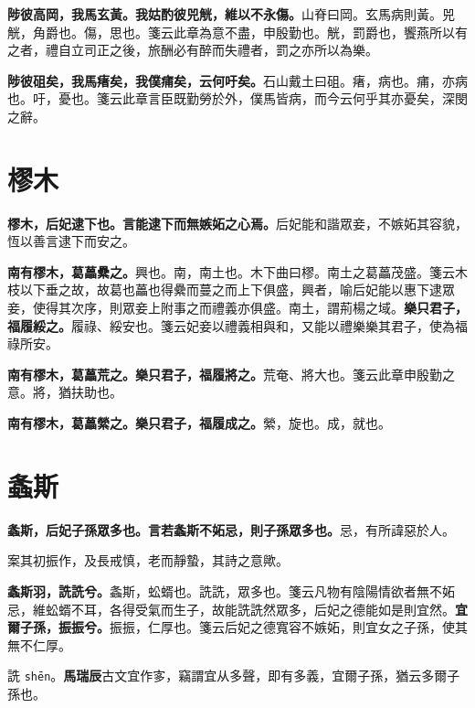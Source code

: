 \textbf{陟彼高岡，我馬玄黃。我姑酌彼兕觥，維以不永傷。}{\footnotesize 山脊曰岡。玄馬病則黃。兕觥，角爵也。傷，思也。箋云此章為意不盡，申殷勤也。觥，罰爵也，饗燕所以有之者，禮自立司正之後，旅酬必有醉而失禮者，罰之亦所以為樂。}

\textbf{陟彼砠矣，我馬瘏矣，我僕痡矣，云何吁矣。}{\footnotesize 石山戴土曰砠。瘏，病也。痡，亦病也。吁，憂也。箋云此章言臣既勤勞於外，僕馬皆病，而今云何乎其亦憂矣，深閔之辭。}

\section{樛木}


\textbf{樛木，后妃逮下也。言能逮下而無嫉妬之心焉。}{\footnotesize 后妃能和諧眾妾，不嫉妬其容貌，恆以善言逮下而安之。}

\textbf{南有樛木，葛藟纍之。}{\footnotesize 興也。南，南土也。木下曲曰樛。南土之葛藟茂盛。箋云木枝以下垂之故，故葛也藟也得纍而蔓之而上下俱盛，興者，喻后妃能以惠下逮眾妾，使得其次序，則眾妾上附事之而禮義亦俱盛。南土，謂荊楊之域。}\textbf{樂只君子，福履綏之。}{\footnotesize 履祿、綏安也。箋云妃妾以禮義相與和，又能以禮樂樂其君子，使為福祿所安。}

\textbf{南有樛木，葛藟荒之。樂只君子，福履將之。}{\footnotesize 荒奄、將大也。箋云此章申殷勤之意。將，猶扶助也。}

\textbf{南有樛木，葛藟縈之。樂只君子，福履成之。}{\footnotesize 縈，旋也。成，就也。}

\section{螽斯}


\textbf{螽斯，后妃子孫眾多也。言若螽斯不妬忌，則子孫眾多也。}{\footnotesize 忌，有所諱惡於人。}

\begin{quoting}案其初振作，及長戒慎，老而靜蟄，其詩之意歟。\end{quoting}

\textbf{螽斯羽，詵詵兮。}{\footnotesize 螽斯，蚣蝑也。詵詵，眾多也。箋云凡物有陰陽情欲者無不妬忌，維蚣蝑不耳，各得受氣而生子，故能詵詵然眾多，后妃之德能如是則宜然。}\textbf{宜爾子孫，振振兮。}{\footnotesize 振振，仁厚也。箋云后妃之德寬容不嫉妬，則宜女之子孫，使其無不仁厚。}

\begin{quoting}詵 \texttt{shēn}。\textbf{馬瑞辰}古文宜作㝖，竊謂宜从多聲，即有多義，宜爾子孫，猶云多爾子孫也。\end{quoting}

